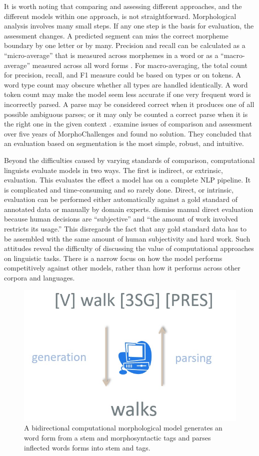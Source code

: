 \documentclass[12pt]{article}
\begin{document}
It is worth noting that comparing and assessing different approaches, and the different models within one approach, is not straightforward. Morphological analysis involves many small steps. If any one step is the basis for evaluation, the assessment changes. A predicted segment can miss the correct morpheme boundary by one letter or by many. Precision and recall can be calculated as a ``micro-average'' that is measured across morphemes in a word or as a ``macro-average'' measured across all word forms \cite{ruokolainen_supervised_2013}. For macro-averaging, the total count for precision, recall, and F1 measure could be based on types or on tokens. A word type count may obscure whether all types are handled identically. A word token count may make the model seem less accurate if one very frequent word is incorrectly parsed. A parse may be considered correct when it produces one of all possible ambiguous parses; or it may only be counted a correct parse when it is the right one in the given context \cite{ruokolainen_supervised_2013}.  examine issues of comparison and assessment over five years of MorphoChallenges and found no solution. They concluded that an evaluation based on segmentation is the most simple, robust, and intuitive. 

Beyond the difficulties caused by varying standards of comparison, computational linguists evaluate models in two ways. The first is indirect, or extrinsic, evaluation. This evaluates the effect a model has on a complete NLP pipeline. It is complicated and time-consuming and so rarely done. Direct, or intrinsic, evaluation can be performed either automatically against a gold standard of annotated data or manually by domain experts.  dismiss manual direct evaluation because human decisions are ``subjective'' and ``the amount of work involved restricts its usage.'' This disregards the fact that any gold standard data has to be assembled with the same amount of human subjectivity and hard work. Such attitudes reveal the difficulty of discussing the value of computational approaches on linguistic tasks. There is a narrow focus on how the model performs competitively against other models, rather than how it performs across other corpora and languages.

\begin{figure}[b]
\begin{center}
\includegraphics[width=0.5\columnwidth]{bidirectionalSYN.jpg}
\caption{A bidirectional computational morphological model generates an word form from a stem and morphosyntactic tags and parses inflected words forms into stem and tags.}
\label{fig:bidir}
\end{center}
\end{figure}
\end{document}
